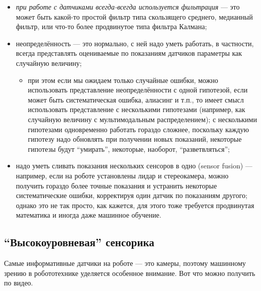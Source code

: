 \documentclass{../../text-style}
\begin{document}
\begin{itemize}
    \item \emph{при работе с датчиками всегда-всегда используется фильтрация} --- это может быть какой-то простой фильтр типа скользящего среднего, медианный фильтр, или что-то более продвинутое типа фильтра Калмана;
    \item неопределённость --- это нормально, с ней надо уметь работать, в частности, всегда представлять оцениваемые по показаниям датчиков параметры как случайную величину;
    \begin{itemize}
        \item при этом если мы ожидаем только случайные ошибки, можно использовать представление неопределённости с одной гипотезой, если может быть систематическая ошибка, алиасинг и т.п., то имеет смысл использовать представление с несколькими гипотезами (например, как случайную величину с мультимодальным распределением); 
            с несколькими гипотезами одновременно работать гораздо сложнее, поскольку каждую гипотезу надо обновлять при получении новых показаний, некоторые гипотезы будут \enquote{умирать}, некоторые, наоборот, \enquote{разветвляться};
    \end{itemize}
    \item надо уметь сливать показания нескольких сенсоров в одно (sensor fusion) --- например, если на роботе установлены лидар и стереокамера, можно получить гораздо более точные показания и устранить некоторые систематические ошибки, корректируя один датчик по показаниям другого;
        однако это не так просто, как кажется, для этого тоже требуется продвинутая математика и иногда даже машинное обучение.
\end{itemize}

\subsection{\enquote{Высокоуровневая} сенсорика}

Самые информативные датчики на роботе --- это камеры, поэтому машинному зрению в робототехнике уделяется особенное внимание. Вот что можно получить по видео.
\end{document}
